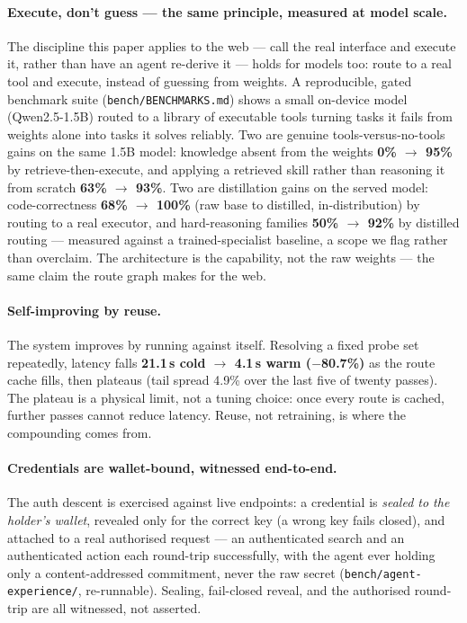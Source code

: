 \documentclass[11pt]{article}
\begin{document}
\paragraph{Execute, don't guess --- the same principle, measured at model scale.} The
discipline this paper applies to the web --- call the real interface and execute it,
rather than have an agent re-derive it --- holds for models too: route to a real tool
and execute, instead of guessing from weights. A reproducible, gated benchmark suite
(\texttt{bench/BENCHMARKS.md}) shows a small on-device model (Qwen2.5-1.5B) routed to a
library of executable tools turning tasks it fails from weights alone into tasks it
solves reliably. Two are genuine tools-versus-no-tools gains on the same 1.5B model:
knowledge absent from the weights \textbf{0\% $\to$ 95\%} by retrieve-then-execute, and
applying a retrieved skill rather than reasoning it from scratch \textbf{63\% $\to$ 93\%}.
Two are distillation gains on the served model: code-correctness \textbf{68\% $\to$ 100\%}
(raw base to distilled, in-distribution) by routing to a real executor, and hard-reasoning
families \textbf{50\% $\to$ 92\%} by distilled routing --- measured against a
trained-specialist baseline, a scope we flag rather than overclaim. The architecture is the
capability, not the raw weights --- the same claim the route graph makes for the web.

\paragraph{Self-improving by reuse.} The system improves by running against itself.
Resolving a fixed probe set repeatedly, latency falls \textbf{21.1\,s cold $\to$ 4.1\,s
warm (\textbf{$-$80.7\%})} as the route cache fills, then plateaus (tail spread 4.9\%
over the last five of twenty passes). The plateau is a physical limit, not a tuning
choice: once every route is cached, further passes cannot reduce latency. Reuse, not
retraining, is where the compounding comes from.

\paragraph{Credentials are wallet-bound, witnessed end-to-end.} The auth descent is
exercised against live endpoints: a credential is \emph{sealed to the holder's wallet},
revealed only for the correct key (a wrong key fails closed), and attached to a real
authorised request --- an authenticated search and an authenticated action each
round-trip successfully, with the agent ever holding only a content-addressed
commitment, never the raw secret (\texttt{bench/agent-experience/}, re-runnable). Sealing,
fail-closed reveal, and the authorised round-trip are all witnessed, not asserted.
\end{document}
